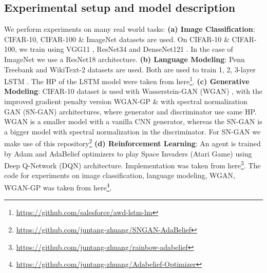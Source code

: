 \subsection{Experimental setup and model description}
We perform experiments on many real world tasks: \textbf{(a) Image Classification}: CIFAR-10, CIFAR-100 \& ImageNet datasets are used. On  CIFAR-10 \& CIFAR-100, we train using VGG11 \cite{VGG}, ResNet34 \cite{Resnet} and DenseNet121 \cite{Densenet}. In the case of ImageNet we use a ResNet18 \cite{Resnet} architecture.  \textbf{(b) Language Modeling}: Penn Treebank \cite{PTB} and WikiText-2 \cite{WikiText_2} datasets are used. Both are used to train 1, 2, 3-layer LSTM \cite{LSTM}. The HP of the LSTM model were taken from here\footnote{\href{https://github.com/salesforce/awd-lstm-lm}{https://github.com/salesforce/awd-lstm-lm}}. \textbf{(c) Generative Modeling}: CIFAR-10 dataset is used with Wasserstein-GAN (WGAN) \cite{WGAN}, with the improved gradient penalty version WGAN-GP \cite{WGAN-GP} \& with spectral normalization GAN (SN-GAN) \cite{SN-GAN} architectures, where generator and discriminator use same HP. WGAN is a smaller model with a vanilla CNN generator, whereas the SN-GAN is a bigger model with spectral normalization in the discriminator. For SN-GAN we make use of this repository\footnote{\href{https://github.com/juntang-zhuang/SNGAN-AdaBelief}{https://github.com/juntang-zhuang/SNGAN-AdaBelief}} \textbf{(d) Reinforcement Learning}: An agent is trained by Adam and AdaBelief optimizers to play Space Invaders (Atari Game) using Deep Q-Network (DQN) \cite{DQN_RL} architecture. Implementation was taken from here\footnote{\label{fnote:juntang_RL_repo}\href{https://github.com/juntang-zhuang/rainbow-adabelief}{https://github.com/juntang-zhuang/rainbow-adabelief}}. The code for experiments on image classification, language modeling, WGAN, WGAN-GP was taken from here\footnote{\label{fnote:juntang_repo}\href{https://github.com/juntang-zhuang/Adabelief-Optimizer}{https://github.com/juntang-zhuang/Adabelief-Optimizer}}.
	
    




